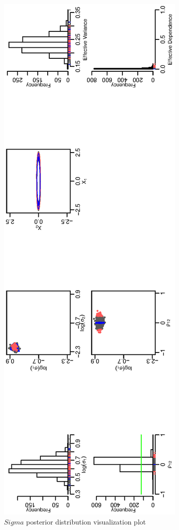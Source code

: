 \documentclass{article}
\begin{document}
\begin{figure}[h!]
\centering
\includegraphics[scale=.6, angle=-90]{var_hhll.ps}
\caption{$Sigma$ posterior distribution visualization plot}
\end{figure} 
\end{document}

